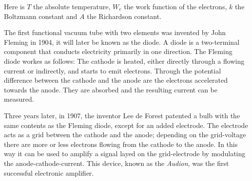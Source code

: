 \documentclass[11pt]{article}
\begin{document}
\noindent
Here is $T$ the absolute temperature, $W_e$ the work function of the electrons, $k$ the Boltzmann constant and $A$ the Richardson constant.

The first functional vacuum tube with two elements was invented by John Fleming in 1904, it will later be known as the diode. A diode is a two-terminal component that conducts electricity primarily in one direction. The Fleming diode workes as follows: The cathode is heated, either directly through a flowing current or indirectly, and starts to emit electrons. Through the potential difference between the cathode and the anode are the electrons accelerated towards the anode. They are absorbed and the resulting current can be measured.


Three years later, in 1907, the inventor Lee de Forest patented a bulb with the same contents as the Fleming diode, except for an added electrode. The electrode acts as a grid between the cathode and the anode; depending on the grid-voltage there are more or less electrons flowing from the cathode to the anode. In this way it can be used to amplify a signal layed on the grid-electrode by modulating the anode-cathode-current. This device, known as the \textit{Audion}, was the first successful electronic amplifier.
\end{document}
